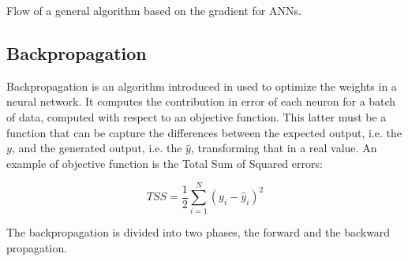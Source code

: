 \begin{algorithm}
	\begin{algorithmic}[1]
		\Repeat
				\EndFor
			\EndFor
	\end{algorithmic}
	\caption{Flow of a general algorithm based on the gradient for ANNs.}\label{alg:ann-training}
\end{algorithm}

\subsection{Backpropagation}\label{subsec:backpropagation}
Backpropagation is an algorithm introduced in \cite{RUM:1986} used to optimize the weights in a neural network. It computes the contribution in error of each neuron for a batch of data, computed with respect to an objective function. This latter must be a function that can be capture the differences between the expected output, i.e. the $y$, and the generated output, i.e. the $\hat{y}$, transforming that in a real value.
An example of objective function is the Total Sum of Squared errors:
\begin{center}
	\begin{equation}
		TSS = \frac{1}{2}\sum\limits_{i=1}^{N}(y_i - \hat{y}_{i})^{2}
	\end{equation}\label{eq:tss}
\end{center}
The backpropagation is divided into two phases, the forward and the backward propagation.

